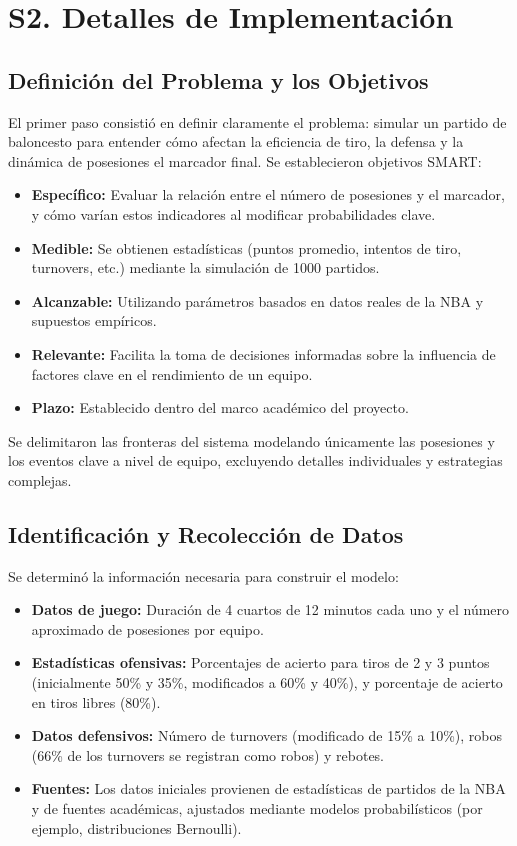 \documentclass[12pt]{article}
\begin{document}
\newpage

\section{S2. Detalles de Implementación}

\subsection{Definición del Problema y los Objetivos}
El primer paso consistió en definir claramente el problema: simular un partido de baloncesto para entender cómo afectan la eficiencia de tiro, la defensa y la dinámica de posesiones el marcador final. Se establecieron objetivos SMART:
\begin{itemize}
	\item \textbf{Específico:} Evaluar la relación entre el número de posesiones y el marcador, y cómo varían estos indicadores al modificar probabilidades clave.
	\item \textbf{Medible:} Se obtienen estadísticas (puntos promedio, intentos de tiro, turnovers, etc.) mediante la simulación de 1000 partidos.
	\item \textbf{Alcanzable:} Utilizando parámetros basados en datos reales de la NBA y supuestos empíricos.
	\item \textbf{Relevante:} Facilita la toma de decisiones informadas sobre la influencia de factores clave en el rendimiento de un equipo.
	\item \textbf{Plazo:} Establecido dentro del marco académico del proyecto.
\end{itemize}
Se delimitaron las fronteras del sistema modelando únicamente las posesiones y los eventos clave a nivel de equipo, excluyendo detalles individuales y estrategias complejas.

\subsection{Identificación y Recolección de Datos}
Se determinó la información necesaria para construir el modelo:
\begin{itemize}
	\item \textbf{Datos de juego:} Duración de 4 cuartos de 12 minutos cada uno y el número aproximado de posesiones por equipo.
	\item \textbf{Estadísticas ofensivas:} Porcentajes de acierto para tiros de 2 y 3 puntos (inicialmente 50\% y 35\%, modificados a 60\% y 40\%), y porcentaje de acierto en tiros libres (80\%).
	\item \textbf{Datos defensivos:} Número de turnovers (modificado de 15\% a 10\%), robos (66\% de los turnovers se registran como robos) y rebotes.
	\item \textbf{Fuentes:} Los datos iniciales provienen de estadísticas de partidos de la NBA y de fuentes académicas, ajustados mediante modelos probabilísticos (por ejemplo, distribuciones Bernoulli).
\end{itemize}
\end{document}
